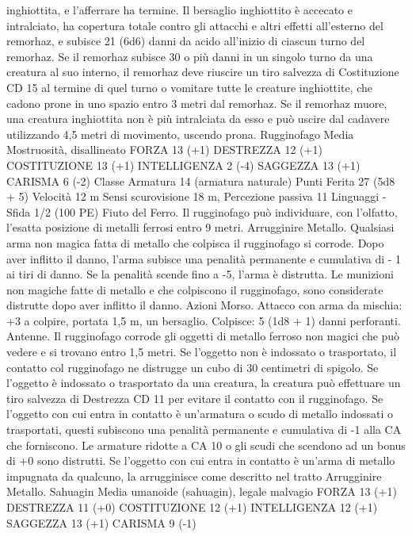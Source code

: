 \begin{multicols}{2}
inghiottita, e l’afferrare ha termine. Il bersaglio inghiottito è
accecato e intralciato, ha copertura totale contro gli attacchi e
altri effetti all’esterno del remorhaz, e subisce 21 (6d6) danni da
acido all’inizio di ciascun turno del remorhaz.
Se il remorhaz subisce 30 o più danni in un singolo turno da una
creatura al suo interno, il remorhaz deve riuscire un tiro salvezza
di Costituzione CD 15 al termine di quel turno o vomitare tutte le
creature inghiottite, che cadono prone in uno spazio entro 3 metri
dal remorhaz. Se il remorhaz muore, una creatura inghiottita non
è più intralciata da esso e può uscire dal cadavere utilizzando 4,5
metri di movimento, uscendo prona.
Rugginofago
Media Mostruosità, disallineato
FORZA 13 (+1)
DESTREZZA 12 (+1)
COSTITUZIONE 13 (+1)
INTELLIGENZA 2 (-4)
SAGGEZZA 13 (+1)
CARISMA 6 (-2)
Classe Armatura 14 (armatura naturale)
Punti Ferita 27 (5d8 + 5)
Velocità 12 m
Sensi scurovisione 18 m, Percezione passiva 11
Linguaggi -
Sfida 1/2 (100 PE)
Fiuto del Ferro. Il rugginofago può individuare, con l’olfatto,
l’esatta posizione di metalli ferrosi entro 9 metri.
Arrugginire Metallo. Qualsiasi arma non magica fatta di metallo
che colpisca il rugginofago si corrode. Dopo aver inflitto il
danno, l’arma subisce una penalità permanente e cumulativa di -
1 ai tiri di danno. Se la penalità scende fino a -5, l’arma è
distrutta. Le munizioni non magiche fatte di metallo e che
colpiscono il rugginofago, sono considerate distrutte dopo aver
inflitto il danno.
Azioni
Morso. Attacco con arma da mischia: +3 a colpire, portata 1,5
m, un bersaglio.
Colpisce: 5 (1d8 + 1) danni perforanti.
Antenne. Il rugginofago corrode gli oggetti di metallo ferroso
non magici che può vedere e si trovano entro 1,5 metri. Se
l’oggetto non è indossato o trasportato, il contatto col
rugginofago ne distrugge un cubo di 30 centimetri di spigolo. Se
l’oggetto è indossato o trasportato da una creatura, la creatura
può effettuare un tiro salvezza di Destrezza CD 11 per evitare il
contatto con il rugginofago.
Se l’oggetto con cui entra in contatto è un’armatura o scudo di
metallo indossati o trasportati, questi subiscono una penalità
permanente e cumulativa di -1 alla CA che forniscono. Le
armature ridotte a CA 10 o gli scudi che scendono ad un bonus di
+0 sono distrutti. Se l’oggetto con cui entra in contatto è un’arma
di metallo impugnata da qualcuno, la arrugginisce come descritto
nel tratto Arrugginire Metallo.
Sahuagin
Media umanoide (sahuagin), legale malvagio
FORZA 13 (+1)
DESTREZZA 11 (+0)
COSTITUZIONE 12 (+1)
INTELLIGENZA 12 (+1)
SAGGEZZA 13 (+1)
CARISMA 9 (-1)

\end{multicols}
